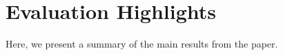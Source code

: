 \section{Evaluation Highlights}
\label{results}

Here, we present a summary of the main results from the paper. 